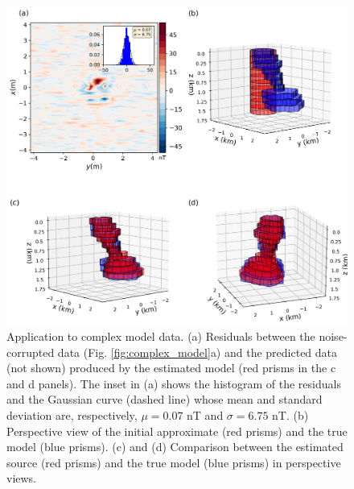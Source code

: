 \begin{figure}
    \centering
    \includegraphics[width=\linewidth]{figures/complex_results.png}
    \caption{Application to complex model data. (a) Residuals between the noise-corrupted data (Fig. \ref{fig:complex_model}a) and the predicted data (not shown) produced by the estimated model (red prisms in the c and d panels). The inset in (a) shows the histogram of the residuals and the Gaussian curve (dashed line) whose mean and standard deviation are, respectively, $\mu = 0.07$ nT and $\sigma=6.75$ nT. (b) Perspective view of the initial approximate (red prisms) and the true model (blue prisms). (c) and (d) Comparison between the estimated source (red prisms) and the true model (blue prisms) in perspective views. 
}
    \label{fig:complex_result}
\end{figure}


